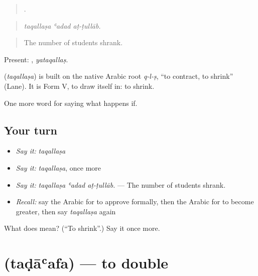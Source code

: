 \begin{quote}
  .
\end{quote}

\begin{quote}
\emph{taqallaṣa ʿadad aṭ-ṭullāb.}
\end{quote}

\begin{quote}
The number of students shrank.
\end{quote}

Present: , \emph{yataqallaṣ}.

\begin{cousinweb}
\textbf{} (\emph{taqallaṣa}) is built on the native Arabic root \emph{q-l-ṣ}, \textquotedblleft{}to contract, to shrink\textquotedblright{} (Lane). It is Form V, to draw itself in: to shrink.
\end{cousinweb}

\begin{grammarlens}[title={What you've built}]
One more word for saying what happens if.
\end{grammarlens}

\subsection*{Your turn}
\begin{itemize}
\raggedright
  \item \emph{Say it:} \emph{taqallaṣa}
  \item \emph{Say it:} \emph{taqallaṣa}, once more
  \item \emph{Say it:} \emph{taqallaṣa ʿadad aṭ-ṭullāb.} — The number of students shrank.
  \item \emph{Recall:} say the Arabic for to approve formally, then the Arabic for to become greater, then say \emph{taqallaṣa} again
\end{itemize}

\begin{tcolorbox}[breakable,colback=teal!4,colframe=teal!35!black,title={Before you move on}]
What does  mean? (\textquotedblleft{}To shrink\textquotedblright{}.) Say it once more.
\end{tcolorbox}
\section[\texorpdfstring{\ar{تضاعف} (taḍāʿafa)}{تضاعف (taḍāʿafa)}]{ (taḍāʿafa) — to double}

